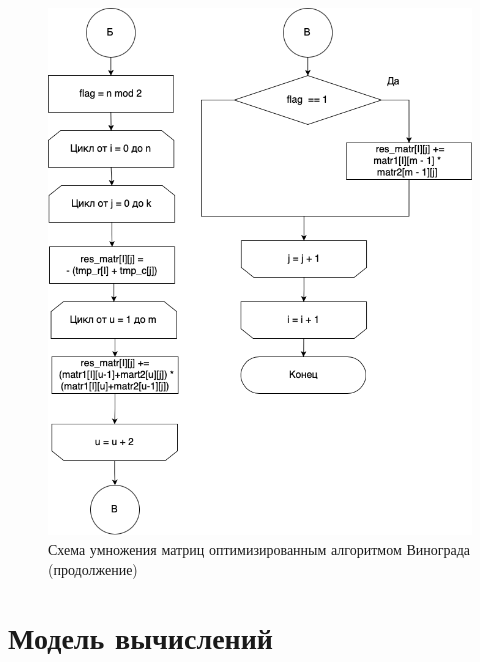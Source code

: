 \documentclass[a4paper,14pt, unknownkeysallowed]{extreport}
\begin{document}
\begin{figure}[h]
	\centering
	\includegraphics[scale=0.7]{img/optimized_winograd_alg_scheme2.png}
	\caption{Схема умножения матриц оптимизированным алгоритмом Винограда (продолжение)}
	\label{fig:optimized_winograd2}
\end{figure}

\clearpage

\section{Модель вычислений}
\end{document}
